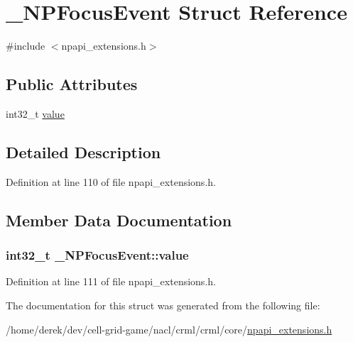 \hypertarget{struct___n_p_focus_event}{
\section{\_\-NPFocusEvent Struct Reference}
\label{struct___n_p_focus_event}
}


{\ttfamily \#include $<$npapi\_\-extensions.h$>$}

\subsection*{Public Attributes}
\begin{DoxyCompactItemize}
\item 
int32\_\-t \hyperlink{struct___n_p_focus_event_af4f66adf55aa4501d2a8b67dbc421210}{value}
\end{DoxyCompactItemize}


\subsection{Detailed Description}


Definition at line 110 of file npapi\_\-extensions.h.



\subsection{Member Data Documentation}
\hypertarget{struct___n_p_focus_event_af4f66adf55aa4501d2a8b67dbc421210}{
\subsubsection[{value}]{\setlength{\rightskip}{0pt plus 5cm}int32\_\-t {\bf \_\-NPFocusEvent::value}}}
\label{struct___n_p_focus_event_af4f66adf55aa4501d2a8b67dbc421210}


Definition at line 111 of file npapi\_\-extensions.h.



The documentation for this struct was generated from the following file:\begin{DoxyCompactItemize}
\item 
/home/derek/dev/cell-\/grid-\/game/nacl/crml/crml/core/\hyperlink{npapi__extensions_8h}{npapi\_\-extensions.h}\end{DoxyCompactItemize}
